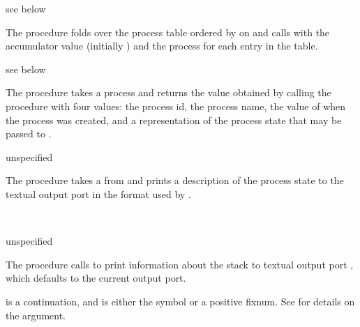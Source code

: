 \begin{procedure}
\end{procedure}
\returns{} see below

The  procedure folds over the process table
ordered by  on  and calls 
with the accumulator value (initially ) and the process
for each entry in the table.

\begin{procedure}
\end{procedure}
\returns{} see below

The  procedure takes a process 
and returns the value obtained by calling the procedure 
with four values:
the process id,
the process name,
the value of  when the process was created,
and a representation of the process state
that may be passed to .

\begin{procedure}
\end{procedure}
\returns{} unspecified

The  procedure takes a  from
 and prints a description of the process state
to the textual output port  in the format used by .

\begin{procedure}
  \\
  \strut
\end{procedure}
\returns{} unspecified

The  procedure calls  to print information
about the stack to textual output port , which defaults to the current
output port.

 is a continuation, and  is either the symbol
 or a positive fixnum.
See \hyperlink{walk-stack}{} for details on the
 argument.

